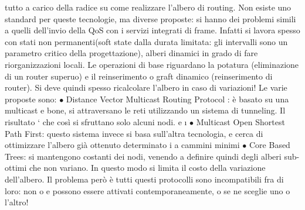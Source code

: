 tutto a carico della radice su come realizzare l'albero di routing.
Non esiste uno standard per queste tecnologie, ma diverse proposte: si hanno
dei problemi simili a quelli dell'invio della QoS con i servizi integrati di frame.
Infatti si lavora spesso con stati non permanenti(soft state dalla durata limitata:
gli intervalli sono un parametro critico della progettazione), alberi dinamici
in grado di fare riorganizzazioni locali. Le operazioni di base riguardano la
potatura (eliminazione di un router superuo) e il reinserimento o graft dinamico
(reinserimento di router). Si deve quindi spesso ricalcolare l'albero in caso di
variazioni! Le varie proposte sono:
$\bullet$ Distance Vector Multicast Routing Protocol : è basato su una multicast
e
bone, si attraversano le reti utilizzando un sistema di tunneling. Il risultato
` che così si sfruttano solo alcuni nodi.
e
\i{}
$\bullet$ Multicast Open Shortest Path First: questo sistema invece si basa sull'altra tecnologia, e cerca di
ottimizzare l'albero già ottenuto determinato i
a
cammini minimi
$\bullet$ Core Based Trees: si mantengono costanti dei nodi, venendo a definire
quindi degli alberi sub-ottimi che non variano. In questo modo si limita il
costo della variazione dell'albero.
Il problema però è tutti questi protocolli sono incompatibili fra di loro: non
o e
possono essere attivati contemporaneamente, o se ne sceglie uno o l'altro!
